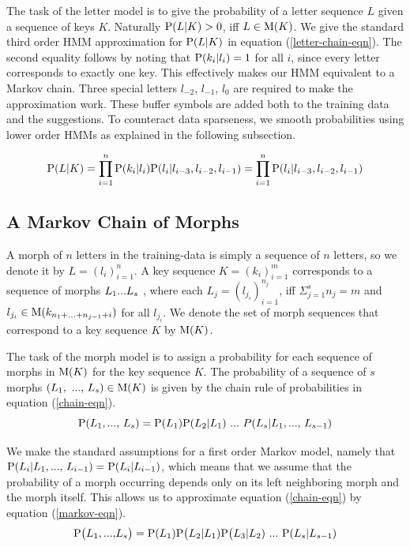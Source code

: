 \documentclass{llncs}
\begin{document}
The task of the letter model is to give the probability of a letter
sequence $L$ given a sequence of keys $K$. Naturally ${\rm P}(L|K) >
0$, iff $L \in {\rm M}(K)$. We give the standard third order HMM
approximation for ${\rm P}(L|K)$ in equation (\ref{letter-chain-eqn}).
The second equality follows by noting that ${\rm P}(k_i|l_i) = 1$ for
all $i$, since every letter corresponds to exactly one key. This
effectively makes our HMM equivalent to a Markov chain. Three special
letters $l_{-2}$, $l_{-1}$, $l_{0}$ are required to make the
approximation work. These buffer symbols are added both to the
training data and the suggestions. To counteract data sparseness, we
smooth probabilities using lower order HMMs as explained in the
following subsection.

\begin{equation}\label{letter-chain-eqn}
{\rm P}(L|K) = \prod_{i=1}^{n}{\rm P}(k_i|l_i){\rm P}(l_i|l_{i-3},l_{i-2},l_{i-1}) = \prod_{i=1}^{n}{\rm P}(l_i|l_{i-3},l_{i-2},l_{i-1})
\end{equation}

\subsection{A Markov Chain of Morphs}

A morph of $n$ letters in the training-data is simply a sequence of $n$
letters, so we denote it by $L = (l_i)_{i=1}^{n}$. A key sequence $K =
(k_i)_{i=1}^{m}$ corresponds to a sequence of morphs $L_1{\rm
  ... }L_s$ , where each $L_j = (l_{j_i})_{i=1}^{n_j}$, iff $\Sigma_{j
  = 1}^{s} n_j = m$ and $l_{j_i} \in {\rm M}(k_{n_1 + {\rm ... } +
  n_{j - 1} + i})$ for all $l_{j_i}$. We denote the set of morph
sequences that correspond to a key sequence $K$ by ${\rm M}(K)$.

The task of the morph model is to assign a probability for each
sequence of morphs in ${\rm M}(K)$ for the key sequence $K$. The
probability of a sequence of $s$ morphs $(L_1{\rm,\ ...,\ }L_s) \in {\rm M}(K)$
is given by the chain rule of probabilities in equation
(\ref{chain-eqn}).
\begin{equation}\label{chain-eqn}
{\rm P}(L_1{\rm, ..., }\ L_s) = {\rm P}(L_1){\rm P}(L_2|L_1)\ {\rm
  ... }\ P(L_s| L_1{\rm, ..., }\ L_{s - 1})
\end{equation}

We make the standard assumptions for a first order Markov model,
namely that ${\rm P}(L_i | L_1{\rm, ..., }\ L_{i-1}) = {\rm P}(L_i |
L_{i-1})$, which means that we assume that the probability of a morph
occurring depends only on its left neighboring morph and the morph
itself. This allows us to approximate equation (\ref{chain-eqn}) by
equation (\ref{markov-eqn}).
\begin{equation}\label{markov-eqn}
{\rm P}\big(L_1{\rm, ..., }L_s\big) = {\rm P}(L_1){\rm P}\big(L_2 |
L_1){\rm P}\big(L_3 | L_2)\ {\rm ... }\ {\rm P}(L_{s} | L_{s-1})
\end{equation}
\end{document}
